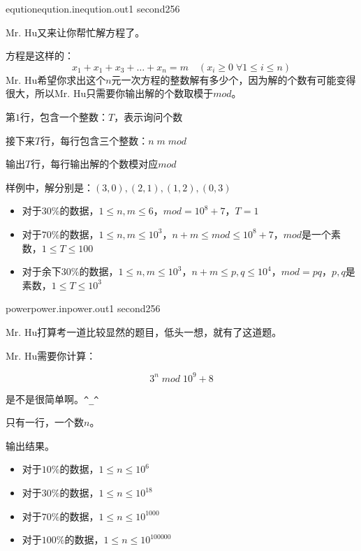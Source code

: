 \documentclass[11pt,a4paper,oneside]{article}
\begin{document}
\begin{problem}{eqution}{eqution.in}{eqution.out}{1 second}{256}
	
	Mr. Hu又来让你帮忙解方程了。
	
	方程是这样的：
	$$
		x_1 + x_1 + x_3 + \dots + x_n = m \quad ( x_i \geq 0 \;  \forall 1 \leq i \leq n  )
	$$
	Mr. Hu希望你求出这个$n$元一次方程的整数解有多少个，因为解的个数有可能变得很大，所以Mr. Hu只需要你输出解的个数取模于$mod$。
	
	\InputFile
	
	第$1$行，包含一个整数：$T$，表示询问个数
	
	接下来$T$行，每行包含三个整数：$n \; m \; mod$
	
	\OutputFile
	
	输出$T$行，每行输出解的个数模对应$ mod $
	
	\Example
	
	\begin{example}
\end{example}

\Note
	样例中，解分别是：$(3,0) , (2,1)  , (1,2) , (0,3)$	
	\begin{itemize}
		\item 对于$30\%$的数据，$ 1 \leq n, m \leq 6 $，$ mod = 10^8 + 7 $，$ T = 1 $
		\item 对于$70\%$的数据，$ 1 \leq n, m \leq 10^3 $，$ n + m \leq mod \leq 10^8 + 7 $，$mod$是一个素数，$ 1 \leq T \leq 100 $
		\item 对于余下$30\%$的数据，$ 1 \leq n, m \leq 10^3$，$ n + m \leq p, q \leq 10^4 $，$mod = pq$，$p, q$是素数，$ 1 \leq T \leq 10^3 $
	\end{itemize}
\end{problem}

\begin{problem}{power}{power.in}{power.out}{1 second}{256}
	
	Mr. Hu打算考一道比较显然的题目，低头一想，就有了这道题。
	
	Mr. Hu需要你计算：
	
	$$
	3^n \; mod \; 10^9 + 8 
	$$
	
	是不是很简单啊。\verb|^_^|
	
	\InputFile
	
	只有一行，一个数$n$。
	
	\OutputFile
	
	输出结果。
	
	\Example
	
	\begin{example}
\end{example}

\Note
\begin{itemize}
	\item 对于$10\%$的数据，$1 \leq n \leq 10^6$
	\item 对于$30\%$的数据，$1 \leq n \leq 10^{18}$
	\item 对于$70\%$的数据，$1 \leq n \leq 10^{1000}$
	\item 对于$100\%$的数据，$1 \leq n \leq 10^{100000}$
\end{itemize}

\end{problem}
\end{document}
